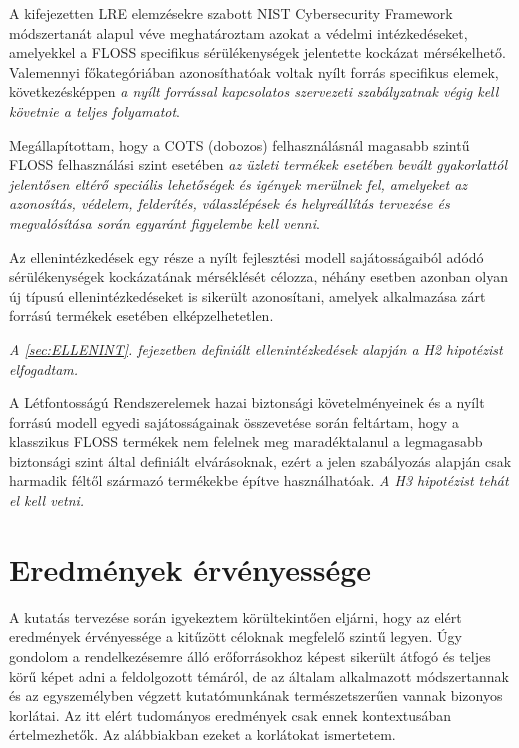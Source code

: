 \documentclass[12pt,magyar,a4paper,oneside]{scrreprt}
\begin{document}
A kifejezetten LRE elemzésekre szabott NIST Cybersecurity Framework
módszertanát alapul véve meghatároztam azokat a védelmi intézkedéseket,
amelyekkel a FLOSS specifikus sérülékenységek jelentette kockázat
mérsékelhető. Valemennyi főkategóriában azonosíthatóak voltak nyílt
forrás specifikus elemek, következésképpen \emph{a nyílt forrással
kapcsolatos szervezeti szabályzatnak végig kell követnie a teljes
folyamatot}.

Megállapítottam, hogy a COTS (dobozos) felhasználásnál magasabb szintű
FLOSS felhasználási szint esetében \emph{az üzleti termékek esetében
bevált gyakorlattól jelentősen eltérő speciális lehetőségek és igények
merülnek fel, amelyeket az azonosítás, védelem, felderítés,
válaszlépések és helyreállítás tervezése és megvalósítása során egyaránt
figyelembe kell venni}.

Az ellenintézkedések egy része a nyílt fejlesztési modell
sajátosságaiból adódó sérülékenységek kockázatának mérséklését célozza,
néhány esetben azonban olyan új típusú ellenintézkedéseket is sikerült
azonosítani, amelyek alkalmazása zárt forrású termékek esetében
elképzelhetetlen.

\emph{A \ref{sec:ELLENINT}. fejezetben definiált ellenintézkedések
alapján a H2 hipotézist elfogadtam.}

A Létfontosságú Rendszerelemek hazai biztonsági követelményeinek és a
nyílt forrású modell egyedi sajátosságainak összevetése során feltártam,
hogy a klasszikus FLOSS termékek nem felelnek meg maradéktalanul a
legmagasabb biztonsági szint által definiált elvárásoknak, ezért a jelen
szabályozás alapján csak harmadik féltől származó termékekbe építve
használhatóak. \emph{A H3 hipotézist tehát el kell vetni.}

\hypertarget{eredmuxe9nyek-uxe9rvuxe9nyessuxe9ge}{%
\section{Eredmények
érvényessége}\label{eredmuxe9nyek-uxe9rvuxe9nyessuxe9ge}}

A kutatás tervezése során igyekeztem körültekintően eljárni, hogy az
elért eredmények érvényessége a kitűzött céloknak megfelelő szintű
legyen. Úgy gondolom a rendelkezésemre álló erőforrásokhoz képest
sikerült átfogó és teljes körű képet adni a feldolgozott témáról, de az
általam alkalmazott módszertannak és az egyszemélyben végzett
kutatómunkának természetszerűen vannak bizonyos korlátai. Az itt elért
tudományos eredmények csak ennek kontextusában értelmezhetők. Az
alábbiakban ezeket a korlátokat ismertetem.
\end{document}
